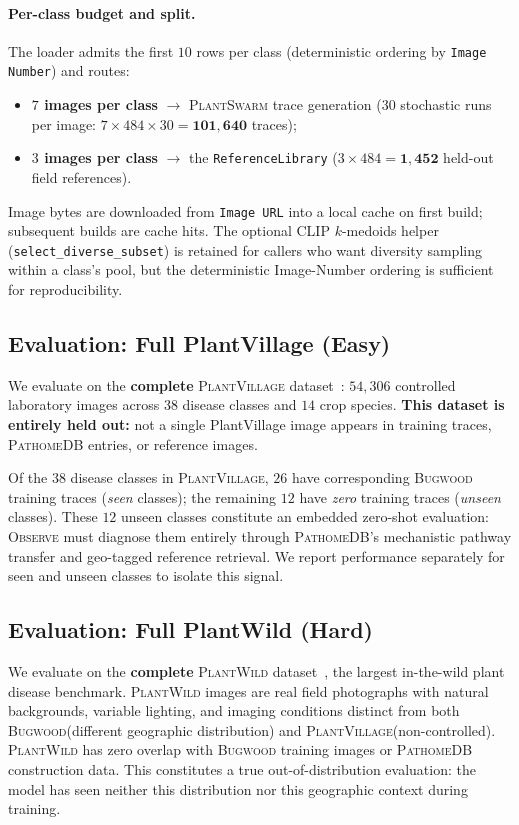 \documentclass[11pt,twocolumn]{article}
\newcommand{\observe}{\textsc{Observe}\xspace}
\newcommand{\plantswarm}{\textsc{PlantSwarm}\xspace}
\newcommand{\pathomedb}{\textsc{PathomeDB}\xspace}
\newcommand{\bugwood}{\textsc{Bugwood}\xspace}
\newcommand{\pv}{\textsc{PlantVillage}\xspace}
\newcommand{\pw}{\textsc{PlantWild}\xspace}
\begin{document}
\paragraph{Per-class budget and split.}
The loader admits the first $10$ rows per class
(deterministic ordering by \texttt{Image Number})
and routes:
\begin{itemize}
  \item \textbf{$7$ images per class} $\to$ \plantswarm
    trace generation ($30$ stochastic runs per
    image: $7 \times 484 \times 30 = \mathbf{101{,}640}$
    traces);
  \item \textbf{$3$ images per class} $\to$ the
    \texttt{ReferenceLibrary} ($3 \times 484
    = \mathbf{1{,}452}$ held-out field references).
\end{itemize}
Image bytes are downloaded from \texttt{Image URL}
into a local cache on first build; subsequent
builds are cache hits. The optional CLIP
$k$-medoids helper (\texttt{select\_diverse\_subset})
is retained for callers who want diversity sampling
within a class's pool, but the deterministic
Image-Number ordering is sufficient for
reproducibility.

\subsection{Evaluation: Full PlantVillage (Easy)}

We evaluate on the \textbf{complete} \pv
dataset~\citep{mohanty2016plantvillage}:
$54{,}306$ controlled laboratory images across
$38$ disease classes and $14$ crop species.
\textbf{This dataset is entirely held out:}
not a single PlantVillage image appears in
training traces, \pathomedb entries, or
reference images.

Of the $38$ disease classes in \pv, $26$
have corresponding \bugwood training traces
(\textit{seen} classes); the remaining $12$
have \textit{zero} training traces
(\textit{unseen} classes). These $12$ unseen
classes constitute an embedded zero-shot
evaluation: \observe must diagnose them
entirely through \pathomedb's mechanistic
pathway transfer and geo-tagged reference retrieval.
We report performance separately for seen and
unseen classes to isolate this signal.

\subsection{Evaluation: Full PlantWild (Hard)}

We evaluate on the \textbf{complete} \pw
dataset~\citep{plantwild}, the largest
in-the-wild plant disease benchmark.
\pw images are real field photographs with
natural backgrounds, variable lighting,
and imaging conditions distinct from both
\bugwood (different geographic distribution)
and \pv (non-controlled).
\pw has zero overlap with \bugwood training
images or \pathomedb construction data.
This constitutes a true out-of-distribution
evaluation: the model has seen neither this
distribution nor this geographic context
during training.
\end{document}
